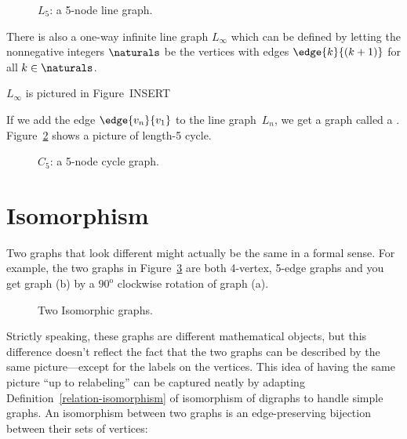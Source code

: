 \begin{figure}


\caption{$L_5$: a 5-node line graph.}

\label{fig:graph_L_5}

\end{figure}

There is also a one-way infinite line graph $L_{\infty}$ which can be
defined by letting the nonnegative integers $\naturals$ be the vertices
with edges $\edge{k}{(k+1)}$ for all $k \in \naturals$.
\begin{editingnotes}
$L_{\infty}$ is pictured in Figure~INSERT%
\end{editingnotes}

If we add the edge $\edge{v_n}{v_1}$ to the line graph~$L_n$, we get a
graph called a  .
Figure~\ref{fig:graph_C_5} shows a picture of length-5 cycle.

\begin{figure}


\caption{$C_5$: a 5-node cycle graph.}
\label{fig:graph_C_5}
\end{figure}

\section{Isomorphism}\label{isomorphism_sec}
Two graphs that look different might actually be the same in a formal
sense.  For example, the two graphs in
Figure~\ref{fig:isomorphic-C4cross} are both 4-vertex, 5-edge graphs
and you get graph (b) by a $90^{\text{o}}$ clockwise rotation of graph
(a).
\begin{figure}

\qquad
{}

\caption{Two Isomorphic graphs.}
\label{fig:isomorphic-C4cross}
\end{figure}

Strictly speaking, these graphs are different mathematical objects,
but this difference doesn't reflect the fact that the two graphs can
be described by the same picture---except for the labels on the
vertices.  This idea of having the same picture ``up to relabeling''
can be captured neatly by adapting
Definition~\ref{relation-isomorphism} of isomorphism of digraphs to
handle simple graphs.  An isomorphism between two graphs is an
edge-preserving bijection between their sets of vertices:

